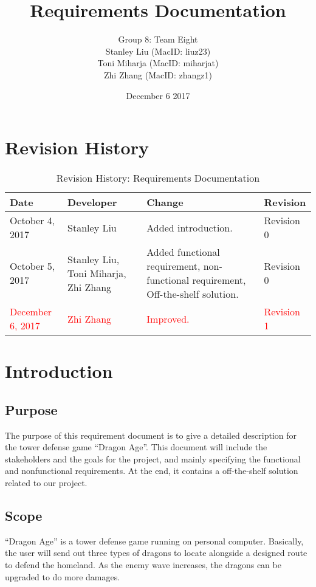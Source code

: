 \documentclass{article}
\title{Requirements Documentation}
\author{Group 8: Team Eight \\
                 Stanley Liu (MacID: liuz23) \\    
                 Toni Miharja (MacID: miharjat)\\
                 Zhi Zhang (MacID: zhangz1)}
\date{December 6 2017 }
\begin{document}
 
\maketitle
\newpage
\tableofcontents
\newpage
 
\section{Revision History}
\begin{table}[h!]
    \centering
    \begin{tabular}{|p{2.5cm}|p{3cm}|p{3cm}|p{2cm}|}
    \hline
    \textbf {Date}  & {Developer} & {Change} & {Revision} \\
    \hline
    October 4, 2017 & Stanley Liu & Added introduction. & Revision 0\\
    \hline
    October 5, 2017  & Stanley Liu, Toni Miharja, Zhi Zhang & Added functional requirement, non-functional requirement, Off-the-shelf solution. & Revision 0\\
    \hline
    \textcolor{red}{December 6, 2017} & \textcolor{red}{Zhi Zhang} & \textcolor{red}{Improved.} & \textcolor{red}{Revision 1}\\
    \hline
    \end{tabular}
    \caption{Revision History: Requirements Documentation}
\end{table}
 
\newpage
 
\section{Introduction}

\subsection{Purpose}
The purpose of this requirement document is to give a detailed description for the tower defense game “Dragon Age”. This document will include the stakeholders and the goals for the project, and mainly specifying the functional and nonfunctional requirements. At the end, it contains a off-the-shelf solution related to our project.

\subsection{Scope}
“Dragon Age” is a tower defense game running on personal computer. Basically, the user will send out three types of dragons to locate alongside a designed route to defend the homeland. As the enemy wave increases, the dragons can be upgraded to do more damages.
\end{document}
